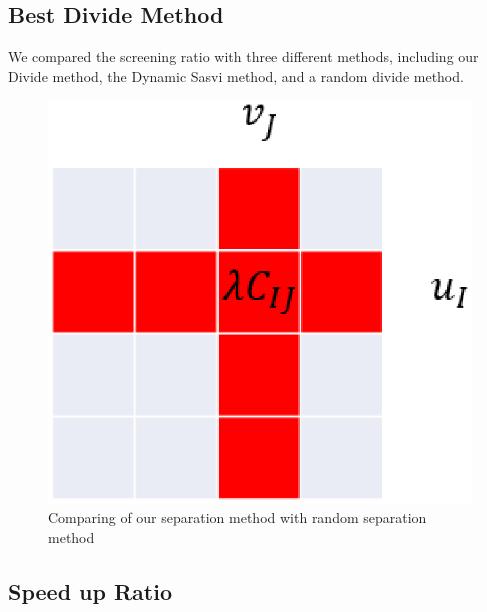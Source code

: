 \documentclass[twoside]{article}
\theoremstyle{plain}
\begin{document}
\subsection{Best Divide Method}
We compared the screening ratio with three different methods, including our Divide method, the Dynamic Sasvi method, and a random divide method. 
	\begin{figure}[h]
	\begin{center}	
	\includegraphics[width = \linewidth]{pic/divide}
	\caption{Comparing of our separation method with random separation method}
	\end{center}	
	\end{figure}

\subsection{Speed up Ratio}
\end{document}
